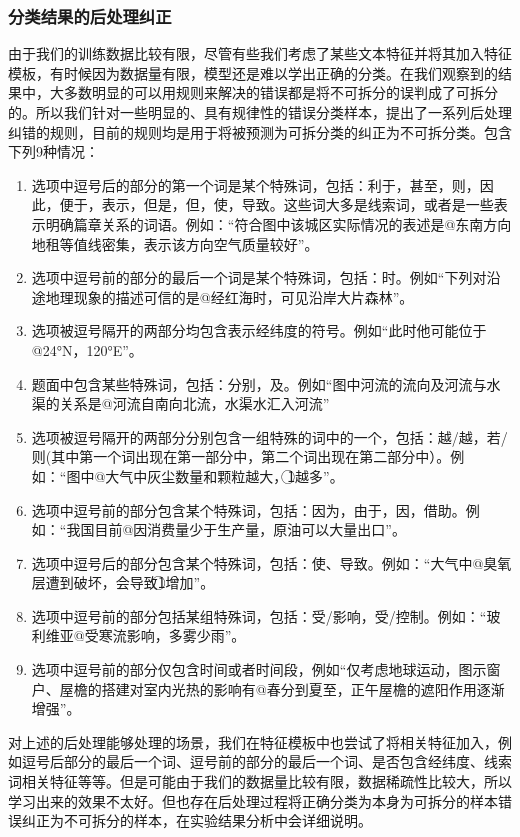 \documentclass[master, winfont]{njuthesis}
\begin{document}
\subsubsection{分类结果的后处理纠正}
由于我们的训练数据比较有限，尽管有些我们考虑了某些文本特征并将其加入特征模板，有时候因为数据量有限，模型还是难以学出正确的分类。在我们观察到的结果中，大多数明显的可以用规则来解决的错误都是将不可拆分的误判成了可拆分的。所以我们针对一些明显的、具有规律性的错误分类样本，提出了一系列后处理纠错的规则，目前的规则均是用于将被预测为可拆分类的纠正为不可拆分类。包含下列9种情况：
\begin{enumerate}
	\item 选项中逗号后的部分的第一个词是某个特殊词，包括：利于，甚至，则，因此，便于，表示，但是，但，使，导致。这些词大多是线索词，或者是一些表示明确篇章关系的词语。例如：“符合图中该城区实际情况的表述是@东南方向地租等值线密集，表示该方向空气质量较好”。
	\item 选项中逗号前的部分的最后一个词是某个特殊词，包括：时。例如“下列对沿途地理现象的描述可信的是@经红海时，可见沿岸大片森林”。
	\item 选项被逗号隔开的两部分均包含表示经纬度的符号。例如“此时他可能位于@24°N，120°E”。
	\item 题面中包含某些特殊词，包括：分别，及。例如“图中河流的流向及河流与水渠的关系是@河流自南向北流，水渠水汇入河流”
	\item 选项被逗号隔开的两部分分别包含一组特殊的词中的一个，包括：越/越，若/则(其中第一个词出现在第一部分中，第二个词出现在第二部分中）。例如：“图中@大气中灰尘数量和颗粒越大，\textcircled{1}越多”。
	\item 选项中逗号前的部分包含某个特殊词，包括：因为，由于，因，借助。例如：“我国目前@因消费量少于生产量，原油可以大量出口”。
	\item 选项中逗号后的部分包含某个特殊词，包括：使、导致。例如：“大气中@臭氧层遭到破坏，会导致\textcircled{1}增加”。
	\item 选项中逗号前的部分包括某组特殊词，包括：受/影响，受/控制。例如：“玻利维亚@受寒流影响，多雾少雨”。
	\item 选项中逗号前的部分仅包含时间或者时间段，例如“仅考虑地球运动，图示窗户、屋檐的搭建对室内光热的影响有@春分到夏至，正午屋檐的遮阳作用逐渐增强”。
\end{enumerate}

对上述的后处理能够处理的场景，我们在特征模板中也尝试了将相关特征加入，例如逗号后部分的最后一个词、逗号前的部分的最后一个词、是否包含经纬度、线索词相关特征等等。但是可能由于我们的数据量比较有限，数据稀疏性比较大，所以学习出来的效果不太好。但也存在后处理过程将正确分类为本身为可拆分的样本错误纠正为不可拆分的样本，在实验结果分析中会详细说明。
\end{document}
